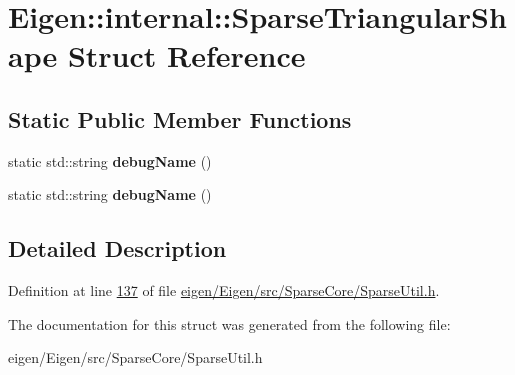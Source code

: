 \hypertarget{struct_eigen_1_1internal_1_1_sparse_triangular_shape}{}\section{Eigen\+:\+:internal\+:\+:Sparse\+Triangular\+Shape Struct Reference}
\label{struct_eigen_1_1internal_1_1_sparse_triangular_shape}
\subsection*{Static Public Member Functions}
\begin{DoxyCompactItemize}
\item 
\mbox{\label{struct_eigen_1_1internal_1_1_sparse_triangular_shape_a9deaef710030116d04eeb881602befe9}} 
static std\+::string {\bfseries debug\+Name} ()
\item 
\mbox{\label{struct_eigen_1_1internal_1_1_sparse_triangular_shape_a9deaef710030116d04eeb881602befe9}} 
static std\+::string {\bfseries debug\+Name} ()
\end{DoxyCompactItemize}


\subsection{Detailed Description}


Definition at line \hyperlink{eigen_2_eigen_2src_2_sparse_core_2_sparse_util_8h_source_l00137}{137} of file \hyperlink{eigen_2_eigen_2src_2_sparse_core_2_sparse_util_8h_source}{eigen/\+Eigen/src/\+Sparse\+Core/\+Sparse\+Util.\+h}.



The documentation for this struct was generated from the following file\+:\begin{DoxyCompactItemize}
\item 
eigen/\+Eigen/src/\+Sparse\+Core/\+Sparse\+Util.\+h\end{DoxyCompactItemize}
